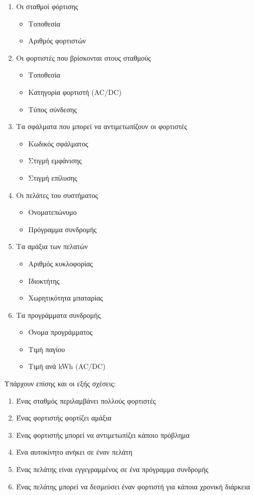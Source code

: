 \documentclass[manuscript,screen,review]{acmart}
\newcommand{\en}[1]{\foreignlanguage{english}{#1}}
\begin{document}
\begin{enumerate}
    \item Οι σταθμοί φόρτισης
    \begin{itemize}
        \item Τοποθεσία
        \item Αριθμός φορτιστών
    \end{itemize}
    \item Οι φορτιστές που βρίσκονται στους σταθμούς
    \begin{itemize}
        \item Τοποθεσία
        \item Κατηγορία φορτιστή (\en{AC/DC})
        \item Τύπος σύνδεσης
    \end{itemize}
    \item Τα σφάλματα που μπορεί να αντιμετωπίζουν οι φορτιστές
    \begin{itemize}
        \item Kωδικός σφάλματος
        \item Στιγμή εμφάνισης
        \item Στιγμή επίλυσης
    \end{itemize}
    \item Οι πελάτες του συστήματος
    \begin{itemize}
        \item Ονοματεπώνυμο
        \item Πρόγραμμα συνδρομής
    \end{itemize}
    \item Τα αμάξια των πελατών
    \begin{itemize}
        \item Αριθμός κυκλοφορίας
        \item Ιδιοκτήτης
        \item Χωρητικότητα μπαταρίας
    \end{itemize}
    \item Τα προγράμματα συνδρομής
    \begin{itemize}
        \item Όνομα προγράμματος
        \item Τιμή παγίου
        \item Τιμή ανά \en{kWh (AC/DC)}
    \end{itemize}
\end{enumerate}

Υπάρχουν επίσης και οι εξής σχέσεις:

\begin{enumerate}
    \item Ένας σταθμός περιλαμβάνει πολλούς φορτιστές
    \item Ένας φορτιστής φορτίζει αμάξια
    \item Ένας φορτιστής μπορεί να αντιμετωπίζει κάποιο πρόβλημα
    \item Ένα αυτοκίνητο ανήκει σε έναν πελάτη
    \item Ένας πελάτης είναι εγγεγραμμένος σε ένα πρόγραμμα συνδρομής
    \item Ένας πελάτης μπορεί να δεσμεύσει έναν φορτιστή για κάποια χρονική διάρκεια
\end{enumerate}
\end{document}
